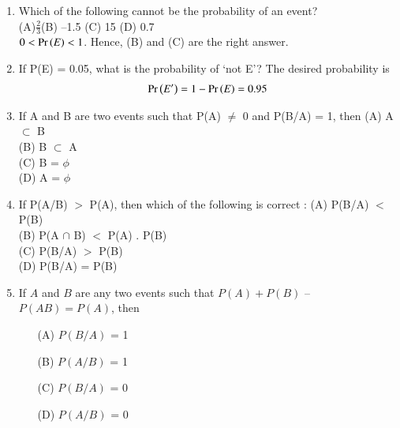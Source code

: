 
\renewcommand{\theequation}{\theenumi}
\begin{enumerate}[label=\thesection.\arabic*.,ref=\thesection.\theenumi]

\item Which of the following cannot be the probability of an event?\\
(A)$\frac{2}{3}$(B) –1.5 (C) 15 (D) 0.7
\\
\solution $0 < \Pr\left(E\right) < 1$.  Hence, (B) and (C) are the right answer.
\item If P(E) = 0.05, what is the probability of ‘not E’?
%
\solution 
The desired probability is
\begin{align}
\Pr\left(E^{\prime}\right) = 1 - \Pr\left(E\right) = 0.95
\end{align}
%
\item If A and B are two events such that P(A) $\neq$ 0 and P(B/A) = 1, then
(A) A $\subset$ B \\
(B) B $\subset$ A \\
(C) B = $\phi$ \\
(D) A = $\phi$\\
\solution


\item If P(A/B) $>$ P(A), then which of the following is correct :
(A) P(B/A) $<$ P(B) \\
(B) P(A $\cap$ B) $<$ P(A) . P(B)\\
(C) P(B/A) $>$ P(B) \\
(D) P(B/A) = P(B)
\\
\solution


\item If $A$ and $B$ are any two events such that $P(A)
+ P(B)$ – $P(AB) = P(A)$, then
\begin{enumerate}
    \item[(A)] $P(B/A)$ = 1
    \item[(B)] $P(A/B)$ = 1
    \item[(C)] $P(B/A)$ = 0
    \item[(D)] $P(A/B)$ = 0
\end{enumerate}
\solution




\end{enumerate}
